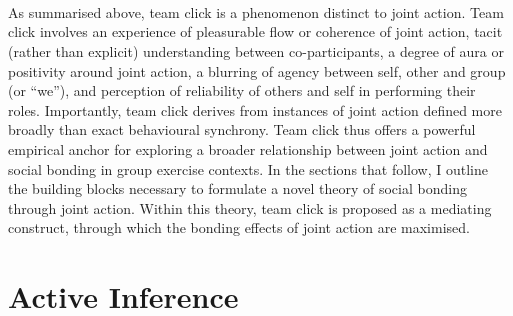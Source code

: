 \begin{CJK}{UTF8}{gbsn}
    \noindent{}

    \\
    \\
    \\



    As summarised above, team click is a phenomenon distinct to joint action.  Team click involves an experience of pleasurable flow or coherence of joint action, tacit (rather than explicit) understanding between co-participants, a degree of aura or positivity around joint action, a blurring of agency between self, other and group (or ``we''), and perception of reliability of others and self in performing their roles. Importantly, team click derives from instances of joint action defined more broadly than exact behavioural synchrony. Team click thus offers a powerful empirical anchor for exploring a broader relationship between joint action and social bonding in group exercise contexts.  In the sections that follow, I outline the building blocks necessary to formulate a novel theory of social bonding through joint action. Within this theory, team click is proposed as a mediating construct, through which the bonding effects of joint action are maximised.


\section{Active Inference \label{sect:activeIn}}


\end{CJK}
